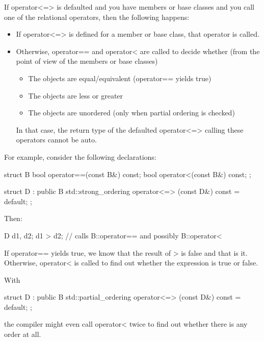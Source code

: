 If operator<=> is defaulted and you have members or base classes and you call one of the relational operators, then the following happens:

\begin{itemize}
\item
If operator<=> is defined for a member or base class, that operator is called.

\item
Otherwise, operator== and operator< are called to decide whether (from the point of view of the members or base classes)

\begin{itemize}
\item
The objects are equal/equivalent (operator== yields true)

\item
The objects are less or greater

\item
The objects are unordered (only when partial ordering is checked)
\end{itemize}

In that case, the return type of the defaulted operator<=> calling these operators cannot be auto.
\end{itemize}

For example, consider the following declarations:

\begin{cpp}
struct B {
	bool operator==(const B&) const;
	bool operator<(const B&) const;
};

struct D : public B {
	std::strong_ordering operator<=> (const D&) const = default;
};
\end{cpp}

Then:

\begin{cpp}
D d1, d2;
d1 > d2; // calls B::operator== and possibly B::operator<
\end{cpp}

If operator== yields true, we know that the result of > is false and that is it. Otherwise, operator< is called to find out whether the expression is true or false.

With

\begin{cpp}
struct D : public B {
	std::partial_ordering operator<=> (const D&) const = default;
};
\end{cpp}

the compiler might even call operator< twice to find out whether there is any order at all.


